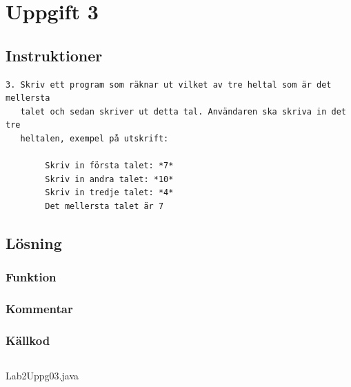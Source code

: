 \section{Uppgift 3}\label{sec:uppg03}

\subsection{Instruktioner}
\begin{verbatim}
3. Skriv ett program som räknar ut vilket av tre heltal som är det mellersta
   talet och sedan skriver ut detta tal. Användaren ska skriva in det tre
   heltalen, exempel på utskrift:

        Skriv in första talet: *7*
        Skriv in andra talet: *10*
        Skriv in tredje talet: *4*
        Det mellersta talet är 7
\end{verbatim}

\subsection{Lösning}

%
%
%
\subsubsection{Funktion}

\subsubsection{Kommentar}


\subsubsection{Källkod}
\inputminted[linenos]{java}{src/Lab2Uppg03.java}
\caption{Lab2Uppg03.java}
\label{src:uppg03}


